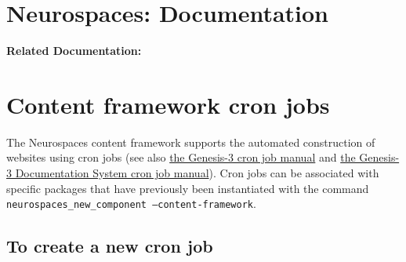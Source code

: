 \documentclass[12pt]{article}
\begin{document}
\section*{Neurospaces: Documentation}

{\bf Related Documentation:}

\section*{Content framework cron jobs}

The Neurospaces content framework supports the automated construction
of websites using cron jobs (see also
\href{http://www.genesis-sim.org/userdocs/neurospaces-cron/neurospaces-cron.html}{the
  Genesis-3 cron job manual} and
\href{http://www.genesis-sim.org/userdocs/userdocs-cron/userdocs-cron.html}{the
  Genesis-3 Documentation System cron job manual}).  Cron jobs can be
associated with specific packages that have previously been
instantiated with the command {\tt neurospaces\_new\_component
  --content-framework}.


\subsection*{To create a new cron job}
\end{document}
